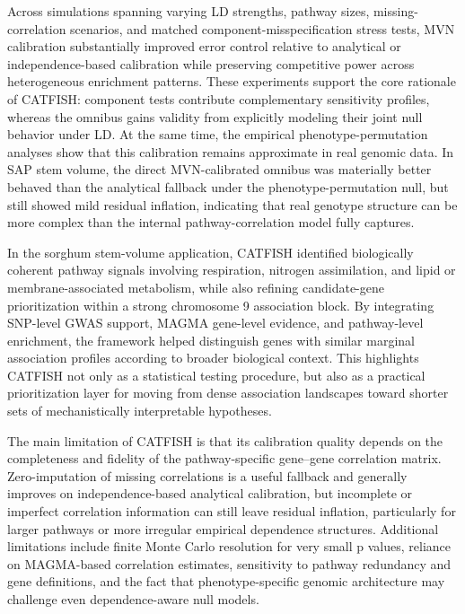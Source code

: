\documentclass[unnumsec,webpdf,contemporary,large]{oup-authoring-template}%
\theoremstyle{thmstyleone}%
\theoremstyle{thmstyletwo}%
\theoremstyle{thmstylethree}%
\begin{document}
Across simulations spanning varying LD strengths, pathway sizes, missing-correlation scenarios, and matched component-misspecification stress tests, MVN calibration substantially improved error control relative to analytical or independence-based calibration while preserving competitive power across heterogeneous enrichment patterns. These experiments support the core rationale of CATFISH: component tests contribute complementary sensitivity profiles, whereas the omnibus gains validity from explicitly modeling their joint null behavior under LD. At the same time, the empirical phenotype-permutation analyses show that this calibration remains approximate in real genomic data. In SAP stem volume, the direct MVN-calibrated omnibus was materially better behaved than the analytical fallback under the phenotype-permutation null, but still showed mild residual inflation, indicating that real genotype structure can be more complex than the internal pathway-correlation model fully captures.

In the sorghum stem-volume application, CATFISH identified biologically coherent pathway signals involving respiration, nitrogen assimilation, and lipid or membrane-associated metabolism, while also refining candidate-gene prioritization within a strong chromosome 9 association block. By integrating SNP-level GWAS support, MAGMA gene-level evidence, and pathway-level enrichment, the framework helped distinguish genes with similar marginal association profiles according to broader biological context. This highlights CATFISH not only as a statistical testing procedure, but also as a practical prioritization layer for moving from dense association landscapes toward shorter sets of mechanistically interpretable hypotheses.

The main limitation of CATFISH is that its calibration quality depends on the completeness and fidelity of the pathway-specific gene--gene correlation matrix. Zero-imputation of missing correlations is a useful fallback and generally improves on independence-based analytical calibration, but incomplete or imperfect correlation information can still leave residual inflation, particularly for larger pathways or more irregular empirical dependence structures. Additional limitations include finite Monte Carlo resolution for very small p values, reliance on MAGMA-based correlation estimates, sensitivity to pathway redundancy and gene definitions, and the fact that phenotype-specific genomic architecture may challenge even dependence-aware null models.
\end{document}
